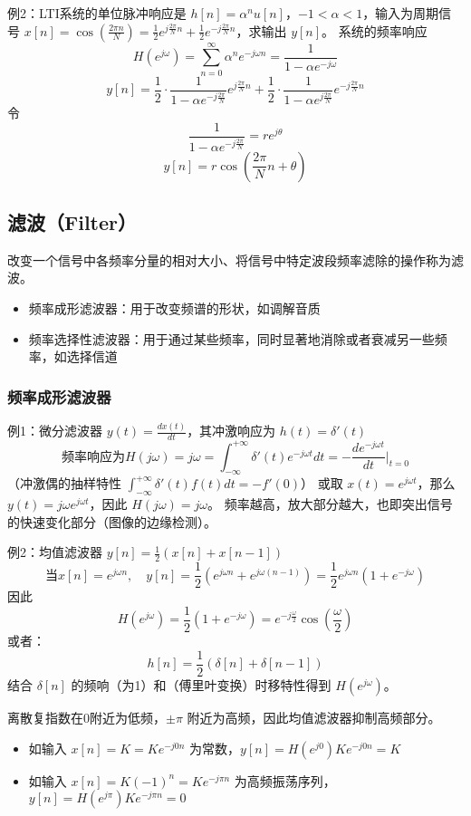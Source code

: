 \documentclass[UTF8]{report}
\theoremstyle{MyLineTheoremStyle} %
\theoremstyle{MyBlockTheoremStyle} %
\theoremstyle{MySubsubsectionStyle} %
\begin{document}
例2：LTI系统的单位脉冲响应是 $h[n] = \alpha^n u[n]$，$-1 < \alpha < 1$，输入为周期信号 $x[n] = \cos \left( \frac{2\pi n}{N} \right) = \frac{1}{2} e^{j \frac{2\pi}{N} n} + \frac{1}{2} e^{-j \frac{2\pi}{N} n}$，求输出 $y[n]$。
系统的频率响应
\[
H(e^{j\omega}) = \sum_{n=0}^{\infty} \alpha^n e^{-j\omega n} = \frac{1}{1 - \alpha e^{-j\omega}}
\]
\[
y[n] = \frac{1}{2} \cdot \frac{1}{1 - \alpha e^{-j \frac{2\pi}{N}}} e^{j \frac{2\pi}{N} n} + \frac{1}{2} \cdot \frac{1}{1 - \alpha e^{j \frac{2\pi}{N}}} e^{-j \frac{2\pi}{N} n}
\]
令
\[
\frac{1}{1 - \alpha e^{-j \frac{2\pi}{N}}} = r e^{j\theta}
\]
\[
y[n] = r \cos \left( \frac{2\pi}{N} n + \theta \right)
\]

\subsection{滤波（Filter）}

改变一个信号中各频率分量的相对大小、将信号中特定波段频率滤除的操作称为滤波。
\begin{itemize}
    \item 频率成形滤波器：用于改变频谱的形状，如调解音质
    \item 频率选择性滤波器：用于通过某些频率，同时显著地消除或者衰减另一些频率，如选择信道
\end{itemize}

\subsubsection{频率成形滤波器}
例1：微分滤波器 $y(t) = \frac{d x(t)}{dt}$，其冲激响应为 $h(t) = \delta'(t)$
\[
\text{频率响应为} H(j\omega) = j\omega = \int_{-\infty}^{+\infty} \delta'(t) e^{-j\omega t} dt = - \frac{d e^{-j\omega t}}{dt} \Bigg|_{t=0}
\]
（冲激偶的抽样特性 $\int_{-\infty}^{+\infty} \delta'(t) f(t) dt = -f'(0)$）
或取 $x(t) = e^{j\omega t}$，那么 $y(t) = j\omega e^{j\omega t}$，因此 $H(j\omega) = j\omega$。
频率越高，放大部分越大，也即突出信号的快速变化部分（图像的边缘检测）。

例2：均值滤波器 $y[n] = \frac{1}{2} \left( x[n] + x[n-1] \right)$
\[
\text{当} x[n] = e^{j\omega n}, \quad y[n] = \frac{1}{2} \left( e^{j\omega n} + e^{j\omega (n-1)} \right) = \frac{1}{2} e^{j\omega n} \left( 1 + e^{-j\omega} \right)
\]
因此
\[
H(e^{j\omega}) = \frac{1}{2} \left( 1 + e^{-j\omega} \right) = e^{-j\frac{\omega}{2}} \cos \left( \frac{\omega}{2} \right)
\]
或者：
\[
h[n] = \frac{1}{2} \left( \delta[n] + \delta[n-1] \right)
\]
结合 $\delta[n]$ 的频响（为1）和（傅里叶变换）时移特性得到 $H(e^{j\omega})$。\par
离散复指数在0附近为低频，$\pm \pi$ 附近为高频，因此均值滤波器抑制高频部分。
\begin{itemize}
    \item 如输入 $x[n] = K = K e^{-j0n}$ 为常数，$y[n] = H(e^{j0}) K e^{-j0n} = K$
    \item 如输入 $x[n] = K(-1)^n = K e^{-j\pi n}$ 为高频振荡序列，$y[n] = H(e^{j\pi}) K e^{-j\pi n} = 0$
\end{itemize}
\end{document}
